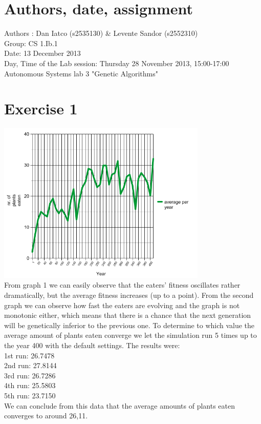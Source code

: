 \documentclass[a4paper,10pt]{article}
\begin{document}
\section*{Authors, date, assignment}
Authors : Dan Iatco (s2535130) \& Levente Sandor (s2552310)\\
Group: CS 1.Ib.1\\
Date:  13 December 2013\\
Day, Time of the Lab session: Thursday 28 November 2013, 15:00-17:00\\
Autonomous Systems lab 3 "Genetic Algorithms"\\

\section*{Exercise 1}
\includegraphics[width=10cm]{graph5.png}\\
From graph 1 we can easily observe that the eaters' fitness oscillates rather dramatically, but the average fitness increases (up to a point). From the second graph we can observe how fast the eaters are evolving and the graph is not monotonic either, which means that there is a chance that the next generation will be genetically inferior to the previous one. To determine to which value the average amount of plants eaten converge we let the simulation run 5 times up to the year 400 with the default settings. 
The results were:\\[0.2cm]
1st run: 26.7478\\
2nd run: 27.8144\\
3rd run: 26.7286\\
4th run: 25.5803\\
5th run: 23.7150\\[0.2cm]
We can conclude from this data that the average amounts of plants eaten converges
to around 26,11.
\end{document}
